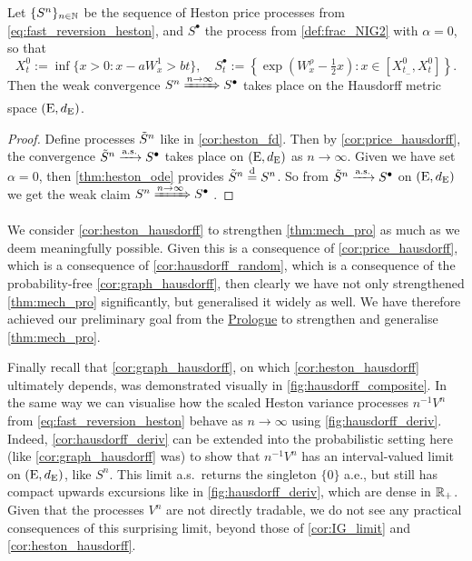 \begin{corollary}\label{cor:heston_hausdorff}
    Let $\{S^n\}_{n\in\mathbb{N}}$ be the sequence of Heston price processes from \autoref{eq:fast_reversion_heston}, and $S^\bullet$ the process from \autoref{def:frac_NIG2} with $\alpha=0$, so that
    \begin{equation}
        X^0_t:=\inf\big\{x>0:x-aW^1_x>bt\big\},\quad S^{\bullet}_t:=\left\{\exp\left(W^\rho_x-\tfrac12 x\right):x\in[X^0_{t_-},X^0_t]\right\}.
    \end{equation}
    Then the weak convergence $S^n\xRightarrow{n\to\infty} S^\bullet$ takes place on the Hausdorff metric space $(\mathrm{E},d_{\mathrm{E}})$.
\end{corollary}
\begin{proof}
    Define processes $\tilde{S}^n$ like in \autoref{cor:heston_fd}. Then by \autoref{cor:price_hausdorff}, the convergence $\tilde{S}^n\xrightarrow{\mathrm{a.s.}} S^\bullet$ takes place on $(\mathrm{E},d_{\mathrm{E}})$ as $n\to\infty$. Given we have set $\alpha=0$, then \autoref{thm:heston_ode} provides $\tilde{S}^n\stackrel{\mathrm{d}}{=} S^n$. So from $\tilde{S}^n\xrightarrow{\mathrm{a.s.}} S^\bullet$ on $(\mathrm{E},d_{\mathrm{E}})$ we get the weak claim $S^n\xRightarrow{n\to\infty} S^\bullet$ .
\end{proof}

We consider \autoref{cor:heston_hausdorff} to strengthen \autoref{thm:mech_pro} as much as we deem meaningfully possible. Given this is a consequence of \autoref{cor:price_hausdorff}, which is a consequence of \autoref{cor:hausdorff_random}, which is a consequence of the probability-free \autoref{cor:graph_hausdorff}, then clearly we have not only strengthened \autoref{thm:mech_pro} significantly, but generalised it widely as well. We have therefore achieved our preliminary goal from the \hyperlink{prologue}{Prologue} to strengthen and generalise \autoref{thm:mech_pro}.

Finally recall that \autoref{cor:graph_hausdorff}, on which \autoref{cor:heston_hausdorff} ultimately depends, was demonstrated visually in \autoref{fig:hausdorff_composite}. In the same way we can visualise how the scaled Heston variance processes $n^{-1}V^{n}$ from \autoref{eq:fast_reversion_heston} behave as $n\to\infty$ using \autoref{fig:hausdorff_deriv}. Indeed, \autoref{cor:hausdorff_deriv} can be extended into the probabilistic setting here (like \autoref{cor:graph_hausdorff} was) to show that $n^{-1}V^n$ has an interval-valued limit on $(\mathrm{E},d_{\mathrm{E}})$, like $S^n$. This limit a.s.~returns the singleton $\{0\}$ a.e., but still has compact upwards excursions like in \autoref{fig:hausdorff_deriv}, which are dense in $\mathbb{R}_+$. Given that the processes $V^n$ are not directly tradable, we do not see any practical consequences of this surprising limit, beyond those of \autoref{cor:IG_limit} and \autoref{cor:heston_hausdorff}.
